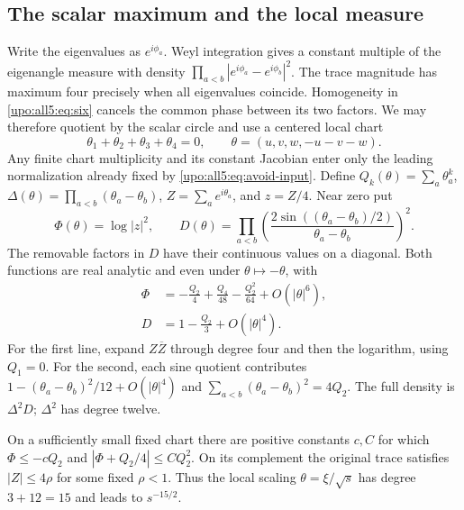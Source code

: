 \documentclass[11pt,letterpaper]{article}
\theoremstyle{remark}\newtheorem{remark}[theorem]{Remark}
\numberwithin{equation}{section}
\begin{document}
\subsection{The scalar maximum and the local measure}
Write the eigenvalues as $e^{i\phi_a}$. Weyl integration gives a
constant multiple of the eigenangle measure with density
$\prod_{a<b}|e^{i\phi_a}-e^{i\phi_b}|^2$. The trace magnitude has
maximum four precisely when all eigenvalues coincide. Homogeneity in
\eqref{upo:all5:eq:six} cancels the common phase between its two factors. We may
therefore quotient by the scalar circle and use a centered local chart
\[
 \theta_1+\theta_2+\theta_3+\theta_4=0,\qquad
 \theta=(u,v,w,-u-v-w).
\]
Any finite chart multiplicity and its constant Jacobian enter only the
leading normalization already fixed by \eqref{upo:all5:eq:avoid-input}.
Define $Q_k(\theta)=\sum_a\theta_a^k$,
$\Delta(\theta)=\prod_{a<b}(\theta_a-\theta_b)$,
$Z=\sum_ae^{i\theta_a}$, and $z=Z/4$. Near zero put
\begin{equation}\label{upo:all5:eq:phase-density}
 \Phi(\theta)=\log|z|^2,\qquad
 D(\theta)=\prod_{a<b}
 \left(\frac{2\sin((\theta_a-\theta_b)/2)}{\theta_a-\theta_b}\right)^2.
\end{equation}
The removable factors in $D$ have their continuous values on a
diagonal. Both functions are real analytic and even under
$\theta\mapsto-\theta$, with
\begin{align}\label{upo:all5:eq:phase-exp}
 \Phi&=-\frac{Q_2}{4}+\frac{Q_4}{48}
                     -\frac{Q_2^2}{64}+O(|\theta|^6),\\
 D&=1-\frac{Q_2}{3}+O(|\theta|^4).\label{upo:all5:eq:density-exp}
\end{align}
For the first line, expand $Z\overline Z$ through degree four and then
the logarithm, using $Q_1=0$. For the second, each sine quotient
contributes $1-(\theta_a-\theta_b)^2/12+O(|\theta|^4)$ and
$\sum_{a<b}(\theta_a-\theta_b)^2=4Q_2$.
The full density is $\Delta^2D$; $\Delta^2$ has degree twelve.

On a sufficiently small fixed chart there are positive constants
$c,C$ for which $\Phi\le-cQ_2$ and $|\Phi+Q_2/4|\le C Q_2^2$.
On its complement the original trace satisfies $|Z|\le4\rho$ for
some fixed $\rho<1$. Thus the local scaling $\theta=\xi/\sqrt{s}$
has degree $3+12=15$ and leads to $s^{-15/2}$.
\end{document}
